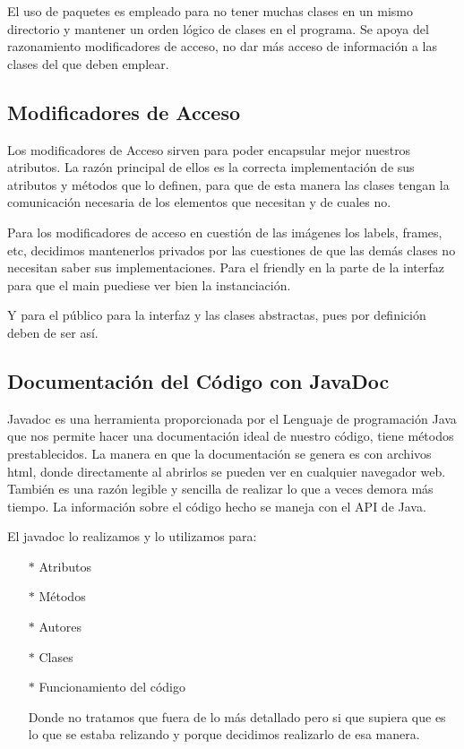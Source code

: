 \documentclass{article}
\begin{document}
El uso de paquetes es empleado para no tener muchas clases en un mismo directorio y mantener un orden lógico de clases en el programa.\newline
Se apoya del razonamiento modificadores de acceso, no dar más acceso de información a las clases del que deben emplear.

\subsection{Modificadores de Acceso}

Los modificadores de Acceso sirven para poder encapsular mejor nuestros atributos. La razón principal de ellos es la correcta implementación de sus atributos 
y métodos que lo definen, para que de esta manera las clases tengan la comunicación necesaria de los elementos que necesitan y de cuales no.\newline

Para los modificadores de acceso en cuestión de las imágenes los labels, frames, etc, decidimos mantenerlos privados por las cuestiones
de que las demás clases no necesitan saber sus implementaciones. Para el friendly en la parte de la interfaz para que el main puediese ver bien
la instanciación.\newline

Y para el público para la interfaz y las clases abstractas, pues por definición deben de ser así.

\subsection{Documentación del Código con JavaDoc}

Javadoc es una herramienta proporcionada por el Lenguaje de programación Java que nos permite hacer una documentación ideal de nuestro código, tiene métodos prestablecidos. La manera en que la documentación se genera es con archivos html, donde directamente al abrirlos se pueden ver en cualquier navegador web. 
También es una razón legible y sencilla de realizar lo que a veces demora más tiempo.  La información sobre el código hecho se maneja con el API de Java.\newline

El javadoc lo realizamos y lo utilizamos para:
\begin{itemize}
\item[$*$] Atributos
\item[$*$] Métodos
\item[$*$] Autores
\item[$*$] Clases
\item[$*$] Funcionamiento del código

Donde no tratamos que fuera de lo más detallado pero si que supiera que es lo que se estaba relizando y porque decidimos realizarlo de esa manera.
\end{itemize}
\end{document}
